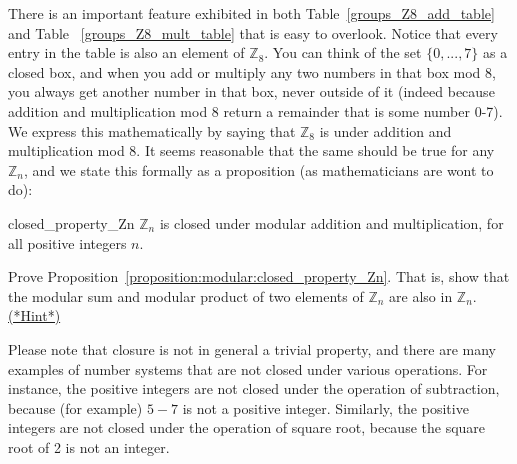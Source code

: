 
There is an important feature exhibited in both Table~\ref{groups_Z8_add_table} and Table ~\ref{groups_Z8_mult_table} that is easy to overlook.
Notice that every entry in the table is also an element of ${\mathbb Z}_8$. You can think of the set $\{0,...,7\}$ as a closed box, and when you add or multiply any two numbers in that box mod $8$, you always get another number in that box, never outside of it (indeed because addition and multiplication mod $8$ return a remainder that is some number 0-7). We express this mathematically by saying that ${\mathbb Z}_8$ is   under addition and multiplication mod $8$. It seems reasonable that the same should be true for any ${\mathbb Z}_n$, and we state this formally as a proposition (as mathematicians are wont to do):



 \begin{prop}{closed_property_Zn}
${\mathbb Z}_n$ is closed under modular addition and multiplication, for all positive integers $n$.
\end{prop}

\begin{exercise}{52}
Prove Proposition~\ref{proposition:modular:closed_property_Zn}. That is, show that the modular sum and modular product of two elements of  ${\mathbb Z}_n$ are also in ${\mathbb Z}_n$.
\hyperref[sec:modular_arithmetic:hints]{(*Hint*)}
\end{exercise}
Please note that closure is not in general a trivial property, and there are many examples of number systems that are not closed under various operations. For instance, the positive integers are not closed under the operation of subtraction, because (for example) $5 - 7$ is not a positive integer. Similarly, the positive integers are not closed under the operation of square root, because the square root of 2 is not an integer.

